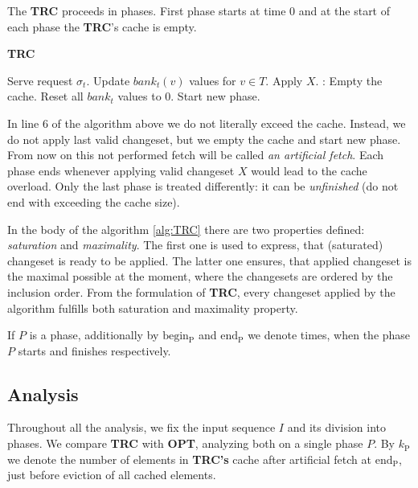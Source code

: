 The \textbf{TRC} proceeds in phases. First phase starts at time 0 and at the
start of each phase the \textbf{TRC}'s cache is empty.  \begin{algorithm}
\caption{\textbf{TRC}} \label{alg:TRC} \begin{algorithmic}[1]  \State Serve request $\sigma_t$.  \State Update $bank_t(v)$
values for $v \in T$.   \State Apply $X$.  : \State Empty the cache.  \State Reset all $bank_t$ values to 0.
\State Start new phase.  \EndIf \EndIf \EndFor \end{algorithmic} \end{algorithm}

In line 6 of the algorithm above we do not literally exceed the cache. Instead,
we do not apply last valid changeset, but we empty the cache and start new
phase. From now on this not performed fetch will be called \textit{an artificial
fetch}.  Each phase ends whenever applying valid changeset $X$ would lead to the
cache overload. Only the last phase is treated differently: it can be
\textit{unfinished} (do not end with exceeding the cache size). 

In the body of the algorithm \ref{alg:TRC} there are two properties defined:
\textit{saturation} and \textit{maximality}. The first one is used to express,
that (saturated) changeset is ready to be applied. The latter one ensures, that
applied changeset is the maximal possible at the moment, where the changesets
are ordered by the inclusion order. From the formulation of \textbf{TRC}, every
changeset applied by the algorithm fulfills both saturation and maximality
property.

If $P$ is a phase, additionally by $\mathrm{begin_P}$ and $\mathrm{end_P}$ we
denote times, when the phase $P$ starts and finishes respectively.

\subsection{Analysis} Throughout all the analysis, we fix the input sequence $I$
and its division into phases. We compare \textbf{TRC} with \textbf{OPT},
analyzing both on a single phase $P$. By $k_{\mathrm{P}}$ we denote the number of elements
in \textbf{TRC's} cache after artificial fetch at $\mathrm{end_P}$, just before
eviction of all cached elements.


